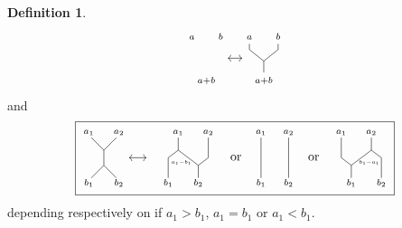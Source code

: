 \documentclass{amsart}
\renewcommand{\1}{\mathbf{1}}
\theoremstyle{definition}
\newtheorem{definition}[theorem]{Definition}
\begin{document}
\begin{definition}
\begin{equation*}
{\begin{tikzpicture}[scale=.4]
		\node[below] at (0,0){$\scriptstyle a+b$};
		\node[above] at (-1,2){$\scriptstyle a$};
		\node[above] at (1,2){$\scriptstyle b$};
		
		\draw[<->] (1.5,1)--(2.5,1);
		
		\path[draw] (4,0)--(4,0.8)--(3,1.6)--(3,2);
		\path[draw] (4,0.8)--(5,1.6)--(5,2);
		
		\node[below] at (4,0){$\scriptstyle a+b$};
		\node[above] at (3,2){$\scriptstyle a$};
		\node[above] at (5,2){$\scriptstyle b$};
		\end{tikzpicture}
	}
	\end{equation*}
	and 
	\begin{equation*}
	\boxed{
		\begin{tikzpicture}[scale=.7]
		\draw (0,.3)--(0,-.3);
		\draw (0,.3)--(.5,.8);\node at (.6,1){$\scriptstyle a_2$};
		\draw (0,.3)--(-.5,.8);\node at (-.6,1){$\scriptstyle a_1$};
		\draw (0,-.3)--(.5,-.8);\node at (.6,-1){$\scriptstyle b_2$};
		\draw (0,-.3)--(-.5,-.8);\node at (-.6,-1){$\scriptstyle b_1$};
		
		\draw[<->] (1,0)--(1.7,0);
		\end{tikzpicture}
		\ \ \
		\begin{tikzpicture}[scale=.7]
		\draw (-.9,.8)--(-.9,.3)--(-1.3,0)--(-1.3,-.8);
		\draw (-.9,.3)--(-.1,-.3);
		\draw (.3,.8)--(.3,0)--(-.1,-.3)--(-.1,-.8);
		\node at (1.4,0){ or };
		\node at (-.9,1){$\scriptstyle a_1$}; \node at (.3,1){$\scriptstyle a_2$};  		
		\node at (-1.3,-1){$\scriptstyle b_1$}; \node at (-.1,-1){$\scriptstyle b_2$}; 
		\draw (-.77,-.19) node[scale = .8] {$\scriptscriptstyle a_1-b_1$};	
		
		\draw (2.4,.8)--(2.4,-.8);
		\draw (3.5,.8)--(3.5,-.8);
		\node at (2.4,1){$\scriptstyle a_1$}; \node at (3.5,1){$\scriptstyle a_2$};  		
		\node at (2.4,-1){$\scriptstyle b_1$}; \node at (3.5,-1){$\scriptstyle b_2$}; 
		
		\node at (4.5,0){ or };
		\draw (5.6,.8)--(5.6,0)--(6,-.3)--(6,-.8);
		\draw (6,-.3)--(6.8,.3);
		\draw (6.8,.8)--(6.8,.3)--(7.2,0)--(7.2,-.8);
		\node at (5.6,1){$\scriptstyle a_1$}; \node at (6.8,1){$\scriptstyle a_2$};  		
		\node at (6,-1){$\scriptstyle b_1$}; \node at (7.2,-1){$\scriptstyle b_2$};
		\draw (6.72,-.19) node[scale = .8]{$\scriptscriptstyle b_1-a_1$}; 
		\end{tikzpicture}
	}
	\end{equation*}
	depending respectively on if $a_1 > b_1$, $a_1 = b_1$ or $a_1 < b_1$.
\end{definition}
\end{document}

